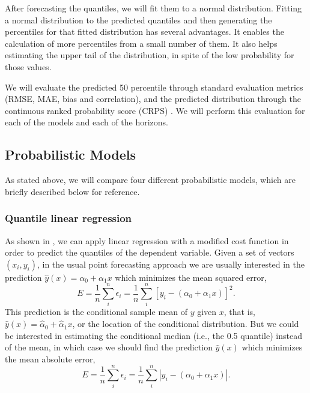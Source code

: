 \documentclass[a4paper,twocolumn,5p]{elsarticle}
\begin{document}
After forecasting the quantiles, we will fit them to a normal
distribution. Fitting a normal distribution to the predicted quantiles
and then generating the percentiles for that fitted distribution has
several advantages. It enables the calculation of more percentiles
from a small number of them.  It also helps estimating the upper tail
of the distribution, in spite of the low probability for those values.

We will evaluate the predicted 50 percentile through standard
evaluation metrics (RMSE, MAE, bias and correlation), and the predicted
distribution through the continuous ranked probability score (CRPS)
. We will perform this evaluation for
each of the models and each of the horizons.

\subsection{Probabilistic Models}
\label{sec:models}

As stated above, we will compare four different probabilistic models,
which are briefly described below for reference.


\subsubsection{Quantile linear regression}

As shown in \cite{koenker_quantile_2001}, we can apply linear
regression with a modified cost function in order to predict the
quantiles of the dependent variable.  Given a set of vectors
$(x_i, y_i)$, in the usual point forecasting approach we are usually
interested in the prediction $\hat y(x) = \alpha_0 + \alpha_1 x$ which
minimizes the mean squared error,
\begin{equation}
  \label{eq:1}
  E = \frac{1}{n} \sum^n_i \epsilon_i =
  \frac{1}{n} \sum^n_i [ y_i - (\alpha_0 + \alpha_1 x) ]^2.
\end{equation}
This prediction is the conditional sample mean of $y$ given $x$, that
is, $\hat y(x) = \hat\alpha_0 + \hat\alpha_1 x$, or the location of
the conditional distribution. But we could be interested in estimating
the conditional median (i.e., the 0.5 quantile) instead of the mean,
in which case we should find the prediction $\hat y(x)$ which
minimizes the mean absolute error,
\begin{equation}
  \label{eq:2}
  E = \frac{1}{n} \sum^n_i \epsilon_i =
  \frac{1}{n} \sum^n_i | y_i - (\alpha_0 + \alpha_1 x) |.
\end{equation}
\end{document}
